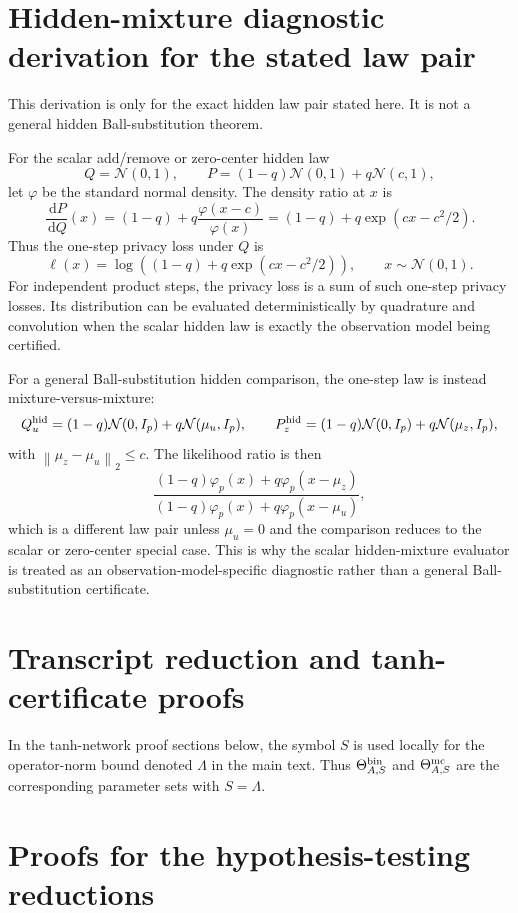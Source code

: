 \documentclass[11pt,a4paper]{report}
\theoremstyle{plain}
\theoremstyle{definition}
\theoremstyle{remark}
\newcommand{\N}{\mathcal{N}}
\newcommand{\dd}{\,\mathrm d}
\newcommand{\norm}[1]{\left\lVert #1\right\rVert}
\begin{document}
\section{Hidden-mixture diagnostic derivation for the stated law pair}
\label{app:hidden-mixture-derivation}

This derivation is only for the exact hidden law pair stated here.  It is not a general hidden Ball-substitution theorem.

For the scalar add/remove or zero-center hidden law
\[
Q=\N(0,1),
\qquad
P=(1-q)\N(0,1)+q\N(c,1),
\]
let $\varphi$ be the standard normal density.  The density ratio at $x$ is
\[
\frac{\dd P}{\dd Q}(x)
=
(1-q)+q\frac{\varphi(x-c)}{\varphi(x)}
=
(1-q)+q\exp(cx-c^2/2).
\]
Thus the one-step privacy loss under $Q$ is
\[
\ell(x)=\log\left((1-q)+q\exp(cx-c^2/2)\right),
\qquad x\sim\N(0,1).
\]
For independent product steps, the privacy loss is a sum of such one-step privacy losses.  Its distribution can be evaluated deterministically by quadrature and convolution when the scalar hidden law is exactly the observation model being certified.

For a general Ball-substitution hidden comparison, the one-step law is instead mixture-versus-mixture:
\[
Q_{u}^{\rm hid}=(1-q)\N(0,I_p)+q\N(\mu_u,I_p),
\qquad
P_{z}^{\rm hid}=(1-q)\N(0,I_p)+q\N(\mu_z,I_p),
\]
with $\norm{\mu_z-\mu_u}_2\le c$.  The likelihood ratio is then
\[
\frac{(1-q)\varphi_p(x)+q\varphi_p(x-\mu_z)}{(1-q)\varphi_p(x)+q\varphi_p(x-\mu_u)},
\]
which is a different law pair unless $\mu_u=0$ and the comparison reduces to the scalar or zero-center special case.  This is why the scalar hidden-mixture evaluator is treated as an observation-model-specific diagnostic rather than a general Ball-substitution certificate.

\section{Transcript reduction and tanh-certificate proofs}
\label{app:transcript-tanh-proofs}
In the tanh-network proof sections below, the symbol $S$ is used locally for the operator-norm bound denoted $\Lambda$ in the main text.  Thus $\Theta_{A,S}^{\rm bin}$ and $\Theta_{A,S}^{\rm mc}$ are the corresponding parameter sets with $S=\Lambda$.

\section{Proofs for the hypothesis-testing reductions}
\label{app:hypothesis-testing-proofs}
\end{document}
